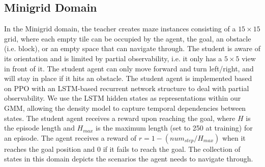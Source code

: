 \subsection{Minigrid Domain}
In the Minigrid domain, the teacher creates maze instances consisting of a $15 \times 15$ grid, where each empty tile can be occupied by the agent, the goal, an obstacle (i.e. block), or an empty space that can navigate through. The student is aware of its orientation and is limited by partial observability, i.e. it only has a $5 \times 5$ view in front of it. The student agent can only move forward and turn left/right, and will stay in place if it hits an obstacle. The student agent is implemented based on PPO \cite{schulman2017proximal} with an LSTM-based recurrent network structure to deal with partial observability. We use the LSTM hidden states as representations within our GMM, allowing the density model to capture temporal dependencies between states. The student agent receives a reward upon reaching the goal, where $H$ is the episode length and $H_{max}$ is the maximum length (set to 250 at training) for an episode. The agent receives a reward of $r=1-(num_{step}/H_{max})$ when it reaches the goal position and 0 if it fails to reach the goal. The collection of states in this domain depicts the scenarios the agent needs to navigate through. 

